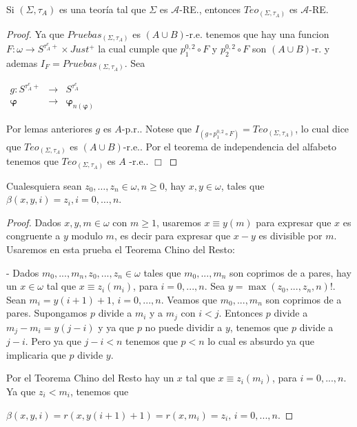   \begin{lemma}
    \PN Si $(\Sigma, \tau_{A})$ es una teoría tal que $\Sigma$ es $\mathcal{A}$-RE., entonces $Teo_{(\Sigma, \tau_{A})}$
    es $\mathcal{A}$-RE.
  \end{lemma}
  \begin{proof}
    Ya que $Pruebas_{(\Sigma ,\tau _{A})}$ es $(A\cup B)$-r.e. tenemos que hay una funcion $F:\omega \rightarrow S^{\tau_{A}^{e}+}\times Just^{+}$ la cual cumple que $p_{1}^{0,2}\circ F$ y $p_{2}^{0,2}\circ F$ son $(A\cup B)$-r. y ademas $I_{F}=Pruebas_{(\Sigma ,\tau _{A})}$. Sea

    $\displaystyle \begin{array}{ccc} g:S^{\tau_{A}^{e}+} & \rightarrow & S^{\tau_{A}^{e}} \\ \mathbf{\varphi } & \rightarrow & \mathbf{\varphi }_{n(\mathbf{\varphi })} \end{array} $

    Por lemas anteriores $g$ es $A$-p.r.. Notese que $I_{(g\circ p_{1}^{0,2}\circ F)}=Teo_{(\Sigma ,\tau _{A})}$, lo cual dice que $ Teo_{(\Sigma ,\tau _{A})}$ es $(A\cup B)$-r.e.. Por el teorema de independencia del alfabeto tenemos que $Teo_{(\Sigma ,\tau _{A})}$ es $A$ -r.e.. $\Box$
  \end{proof}

  \begin{lemma} \label{lemma_114}
    \PN Cualesquiera sean $z_{0}, \dotsc, z_{n} \in \omega, n \geq 0$, hay $x, y \in \omega$, tales que $\beta(x, y, i)
    = z_{i}, i = 0, \dotsc, n$.
  \end{lemma}
  \begin{proof}
    Dados $x,y,m\in \omega $ con $m\geq 1$, usaremos $x\equiv y(m)$ para expresar que $x$ es congruente a $y$ modulo $m$, es decir para expresar que $ x-y$ es divisible por $m$. Usaremos en esta prueba el Teorema Chino del Resto:

    - Dados $m_{0},...,m_{n},z_{0},...,z_{n}\in \omega $ tales que $ m_{0},...,m_{n}$ son coprimos de a pares, hay un $x\in \omega $ tal que $ x\equiv z_{i}(m_{i})$, para $i=0,...,n.$
    Sea $y=\max (z_{0},...,z_{n},n)!$. Sean $m_{i}=y(i+1)+1$, $i=0,...,n$. Veamos que $m_{0},...,m_{n}$ son coprimos de a pares. Supongamos $p$ divide a $m_{i}$ y a $m_{j}$ con $i< j$. Entonces $p$ divide a $m_{j}-m_{i}=y(j-i)$ y ya que $p$ no puede dividir a $y$, tenemos que $p$ divide a $j-i$. Pero ya que $j-i< n$ tenemos que $p< n$ lo cual es absurdo ya que implicaria que $p$ divide $y$.

    Por el Teorema Chino del Resto hay un $x$ tal que $x\equiv z_{i}(m_{i})$, para $i=0,...,n$. Ya que $z_{i}< m_{i}$, tenemos que

    $\displaystyle \beta (x,y,i)=r(x,y(i+1)+1)=r(x,m_{i})=z_{i}\text{, }i=0,...,n\text{.} $
  \end{proof}

